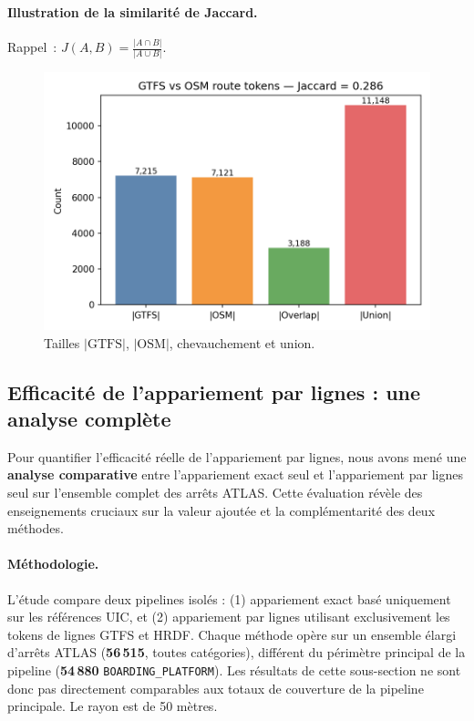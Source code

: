 \paragraph{Illustration de la similarité de Jaccard.} Rappel : \(J(A,B) = \frac{|A \cap B|}{|A \cup B|}\).

\begin{figure}[H]
  \centering
  \includegraphics[width=\textwidth]{../figures/chap4/jaccard_sets_bars.png}
  \caption*{Tailles \(|\mathrm{GTFS}|\), \(|\mathrm{OSM}|\), chevauchement et union.}
\end{figure}

\subsection{Efficacité de l'appariement par lignes : une analyse complète}
Pour quantifier l'efficacité réelle de l'appariement par lignes, nous avons mené une \textbf{analyse comparative} entre l'appariement exact seul et l'appariement par lignes seul sur l'ensemble complet des arrêts ATLAS. Cette évaluation révèle des enseignements cruciaux sur la valeur ajoutée et la complémentarité des deux méthodes.

\paragraph{Méthodologie.} L'étude compare deux pipelines isolés : (1) appariement exact basé uniquement sur les références UIC, et (2) appariement par lignes utilisant exclusivement les tokens de lignes GTFS et HRDF. Chaque méthode opère sur un ensemble élargi d'arrêts ATLAS (\textbf{56\,515}, toutes catégories), différent du périmètre principal de la pipeline (\textbf{54\,880} \texttt{BOARDING\_PLATFORM}). Les résultats de cette sous-section ne sont donc pas directement comparables aux totaux de couverture de la pipeline principale. Le rayon est de 50 mètres.

